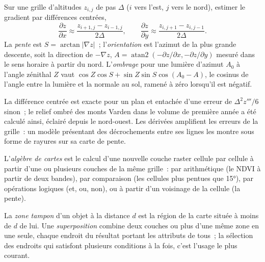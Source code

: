 \begin{method}\label{met:b3:remote-sensing-gis:slope}
Sur une grille d'altitudes $z_{i,j}$ de pas $\Delta$ ($i$ vers l'est, $j$
vers le nord), estimer le gradient par différences centrées,
\[
\frac{\partial z}{\partial x} \approx \frac{z_{i+1,j} - z_{i-1,j}}{2\Delta} ,
\qquad
\frac{\partial z}{\partial y} \approx \frac{z_{i,j+1} - z_{i,j-1}}{2\Delta} .
\]
La \emph{pente} est $S = \arctan|\nabla z|$~; l'\emph{orientation} est
l'azimut de la plus grande descente, soit la direction de $-\nabla z$, $A =
\operatorname{atan2}(-\partial z/\partial x, -\partial z/\partial y)$
mesuré dans le sens horaire à partir du nord. L'\emph{ombrage} pour une lumière
d'azimut $A_0$ à l'angle zénithal $Z$ vaut $\cos Z\cos S + \sin Z\sin S
\cos(A_0 - A)$, le cosinus de l'angle entre la lumière et la normale
au sol, ramené à zéro lorsqu'il est négatif.
\end{method}

La différence centrée est exacte pour un plan et entachée d'une erreur de
$\Delta^2 z'''/6$ sinon~; le relief ombré des monts Varden dans le
volume de première année a été calculé ainsi, éclairé depuis le nord-ouest. Les dérivées
amplifient les erreurs de la grille~: un modèle présentant des décrochements entre ses lignes
les montre sous forme de rayures sur sa carte de pente.

\begin{definition}\label{def:b3:remote-sensing-gis:map-algebra}
L'\emph{algèbre de cartes} est le calcul d'une nouvelle couche raster
cellule par cellule à partir d'une ou plusieurs couches de la même grille~: par arithmétique
(le NDVI à partir de deux bandes), par comparaison (les cellules plus pentues que
\ang{15}), par opérations logiques (et, ou, non), ou à partir d'un voisinage
de la cellule (la pente).
\end{definition}

\begin{definition}\label{def:b3:remote-sensing-gis:operations}
La \emph{zone tampon} d'un objet à la distance $d$ est
la région de la carte située à moins de $d$ de lui. Une
\emph{superposition} combine deux couches ou plus
d'une même zone en une seule, chaque endroit du résultat portant les attributs
de tous~; la sélection des endroits qui satisfont plusieurs conditions à la
fois, c'est l'usage le plus courant.
\end{definition}

